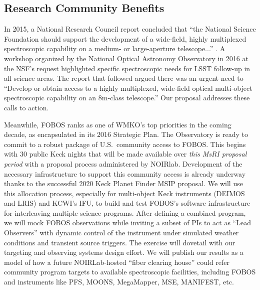 \documentclass[oneside,11pt]{amsart}
\begin{document}

\subsection{Research Community Benefits}
\label{sec:community}

In 2015, a National Research Council report concluded that ``the National Science
Foundation should support the development of a wide-field, highly multiplexed spectroscopic capability on a medium- or
large-aperture telescope...'' \citep{NAP21722}.  A workshop organized by the National Optical Astronomy Observatory in
2016 at the NSF's request highlighted specific spectroscopic needs for LSST follow-up in all science areas.  The report
that followed argued there was an urgent need to ``Develop or obtain access to a highly multiplexed, wide-field optical
multi-object spectroscopic capability on an 8m-class telescope.''  Our proposal addresses these calls to action.

Meanwhile, FOBOS ranks as one of WMKO’s top priorities in the coming decade, as encapsulated in its 2016 Strategic
Plan.  The Observatory is ready to commit to a robust package of U.S.\ community access to FOBOS.  This begins with 
 30 public Keck nights that will be made available over \emph{this MsRI proposal
period} with a proposal process administered by NOIRlab.  Development of the necessary infrastructure to support this community access is already underway thanks to the successful 2020 Keck Planet Finder MSIP proposal.  We will use this allocation process, especially for multi-object Keck instruments (DEIMOS and LRIS) and KCWI's IFU, to build and test FOBOS's software infrastructure for interleaving multiple science programs.  After defining a combined program, we will mock FOBOS observations while inviting a subset of PIs to act as ``Lead Observers'' with dynamic control of the instrument under simulated weather conditions and transient source triggers.  The exercise will dovetail with our targeting and observing systems design effort.  We will publish our results as a model of how a future NOIRLab-hosted ``fiber clearing house'' could refer community program targets to available spectroscopic facilities, including FOBOS and instruments like PFS, MOONS, MegaMapper, MSE, MANIFEST, etc.

\end{document}
